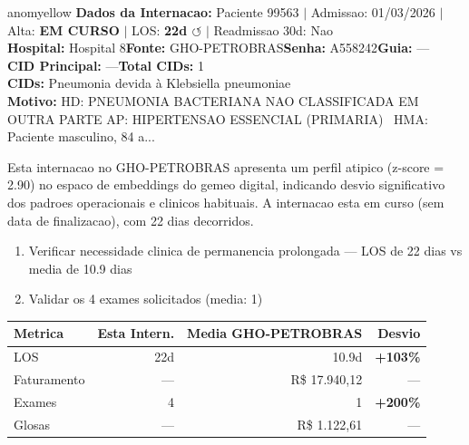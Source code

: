 \documentclass[a4paper,10pt]{article}
\begin{document}
\begin{anomalycard}[Internacao 167460 | GHO-PETROBRAS | MODERADO (z=2.90)]{anomyellow}
\textbf{Dados da Internacao:} Paciente 99563 $\mid$ Admissao: 01/03/2026 $\mid$ Alta: \textcolor{anomorange}{\textbf{EM CURSO}} $\mid$ LOS: \textbf{22d \textcolor{anomorange}{$\circlearrowleft$}} $\mid$ Readmissao 30d: Nao\\
\textbf{Hospital:} Hospital 8\quad\textbf{Fonte:} GHO-PETROBRAS\quad\textbf{Senha:} A558242\quad\textbf{Guia:} ---\\
\textbf{CID Principal:} {\small ---}\quad\textbf{Total CIDs:} 1\\

\textbf{CIDs:} {\scriptsize Pneumonia devida à Klebsiella pneumoniae}\\

\textbf{Motivo:} {\scriptsize HD: PNEUMONIA BACTERIANA NAO CLASSIFICADA EM OUTRA PARTE  AP: HIPERTENSAO ESSENCIAL (PRIMARIA)   HMA: Paciente masculino, 84 a...}\\

\vspace{2pt}\begin{tcolorbox}[colback=severityred!20,colframe=anomyellow,title={\textbf{Interpretacao de Negocio}},fonttitle=\bfseries\small,left=4pt,right=4pt,top=3pt,bottom=3pt]
{\small Esta internacao no GHO-PETROBRAS apresenta um perfil atipico (z-score = 2.90) no espaco de embeddings do gemeo digital, indicando desvio significativo dos padroes operacionais e clinicos habituais. A internacao esta em curso (sem data de finalizacao), com 22 dias decorridos.}
\end{tcolorbox}
\begin{tcolorbox}[colback=severityyellow!30,colframe=anomorange,title={\textbf{Recomendacoes Especificas}},fonttitle=\bfseries\small,left=4pt,right=4pt,top=3pt,bottom=3pt]
\begin{enumerate}[nosep,leftmargin=16pt]
\item {\small Verificar necessidade clinica de permanencia prolongada --- LOS de 22 dias vs media de 10.9 dias}
\item {\small Validar os 4 exames solicitados (media: 1)}
\end{enumerate}
\end{tcolorbox}
\begin{center}\begin{tabular}{l r r r}\toprule\textbf{Metrica} & \textbf{Esta Intern.} & \textbf{Media GHO-PETROBRAS} & \textbf{Desvio} \\\midrule
LOS & 22d & 10.9d & \textcolor{anomred}{\textbf{+103\%}} \\
Faturamento & --- & R\$ 17.940,12 & --- \\
Exames & 4 & 1 & \textcolor{anomred}{\textbf{+200\%}} \\
Glosas & --- & R\$ 1.122,61 & --- \\
\bottomrule\end{tabular}\end{center}


\end{anomalycard}
\end{document}
